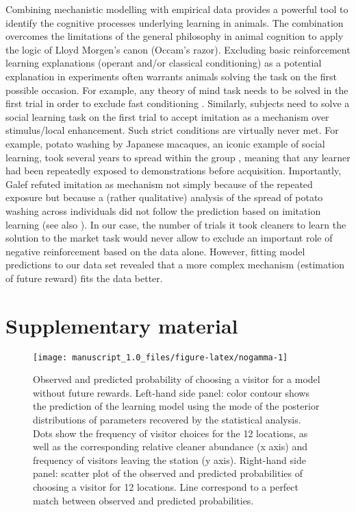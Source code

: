 \documentclass[]{rsos}%
\newcommand{\beginsupplement}{ \setcounter{table}{0}     \renewcommand{\thetable}{S\arabic{table}}\setcounter{figure}{0} \renewcommand{\thefigure}{S\arabic{figure}}}
\begin{document}
Combining mechanistic modelling with empirical data provides a powerful
tool to identify the cognitive processes underlying learning in animals.
The combination overcomes the limitations of the general philosophy in
animal cognition to apply the logic of Lloyd Morgen's canon (Occam's
razor). Excluding basic reinforcement learning explanations (operant
and/or classical conditioning) as a potential explanation in experiments
often warrants animals solving the task on the first possible occasion.
For example, any theory of mind task needs to be solved in the first
trial in order to exclude fast conditioning \citep{heyes_Theory_1998}.
Similarly, subjects need to solve a social learning task on the first
trial to accept imitation as a mechanism over stimulus/local
enhancement. Such strict conditions are virtually never met. For
example, potato washing by Japanese macaques, an iconic example of
social learning, took several years to spread within the group
\citep{kawamura_Process_1959}, meaning that any learner had been repeatedly
exposed to demonstrations before acquisition. Importantly, Galef
\citep{galef_Question_1992} refuted imitation as mechanism not simply because
of the repeated exposure but because a (rather qualitative) analysis of
the spread of potato washing across individuals did not follow the
prediction based on imitation learning (see also
\citep{hirata_SweetPotato_2001}). In our case, the number of trials it took
cleaners to learn the solution to the market task would never allow to
exclude an important role of negative reinforcement based on the data
alone. However, fitting model predictions to our data set revealed that
a more complex mechanism (estimation of future reward) fits the data
better.

\newpage

\hypertarget{supplementary-material}{%
\section{Supplementary material}\label{supplementary-material}}

\beginsupplement

\begin{figure}[H]

{\centering \texttt{[image: manuscript\_1.0\_files/figure-latex/nogamma-1]} 

}

\caption{Observed and predicted probability of choosing a visitor for a model without future rewards. Left-hand side panel: color contour shows the prediction of the learning model using the mode of the posterior distributions of parameters recovered by the statistical analysis. Dots show the frequency of visitor choices for the 12 locations, as well as the corresponding relative cleaner abundance (x axis) and frequency of visitors leaving the station (y axis). Right-hand side panel: scatter plot of the observed and predicted probabilities of choosing a visitor for 12 locations. Line correspond to a perfect match between observed and predicted probabilities.}\label{fig:nogamma}
\end{figure}
\end{document}
